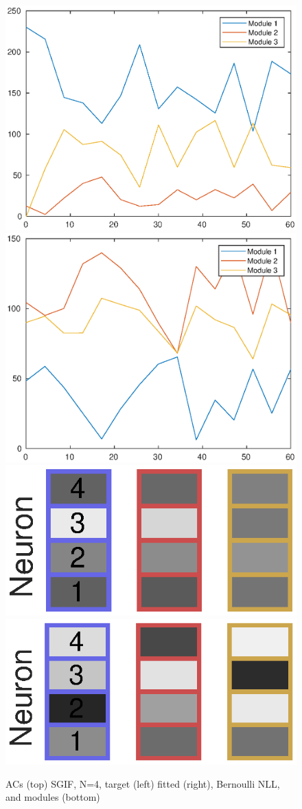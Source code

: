 \documentclass[mphil,deptreport,ianc]{infthesis} %
\begin{document}


\begin{figure}
    \includegraphics[width=0.49\columnwidth]{figures/matlab/NMF/ACs_target_GT_model_mesoGIF_N_4.eps}
    \includegraphics[width=0.49\columnwidth]{figures/matlab/NMF/ACs_nuovo_spikes_mt_microGIF_euid_12-09_16-02-03-400_lfn_bernoulli_nll.eps}
    \centering
    \includegraphics[width=0.3\columnwidth]{figures/matlab/NMF/target_GT_model_mesoGIF_N_4.eps}
    \includegraphics[width=0.3\columnwidth]{figures/matlab/NMF/modules_nuovo_spikes_mt_microGIF_euid_12-09_16-02-03-400_lfn_bernoulli_nll_4.eps}
    \caption{ACs (top) SGIF, N=4, target (left) fitted (right), Bernoulli NLL, and modules (bottom)}
\end{figure}
\end{document}
